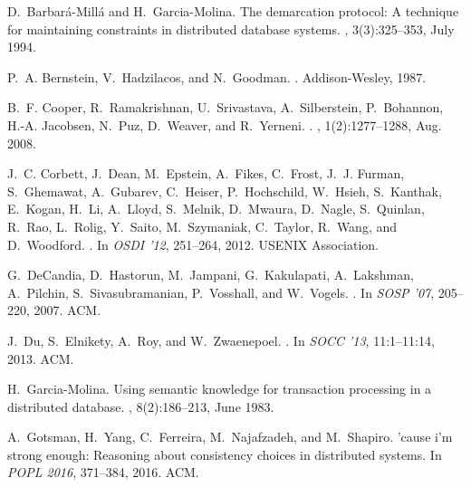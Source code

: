 \documentclass[11pt,dvipdfm]{article}
\begin{document}
\begin{thebibliography}{10}
\begin{small}
D.~Barbar\'{a}-Mill\'{a} and H.~Garcia-Molina.
\newblock The demarcation protocol: A technique for maintaining constraints in
  distributed database systems.
, 3(3):325--353, July 1994.

P.~A. Bernstein, V.~Hadzilacos, and N.~Goodman.
.
\newblock Addison-Wesley, 1987.

B.~F. Cooper, R.~Ramakrishnan, U.~Srivastava, A.~Silberstein, P.~Bohannon,
  H.-A. Jacobsen, N.~Puz, D.~Weaver, and R.~Yerneni.
.
, 1(2):1277--1288, Aug. 2008.

J.~C. Corbett, J.~Dean, M.~Epstein, A.~Fikes, C.~Frost, J.~J. Furman,
  S.~Ghemawat, A.~Gubarev, C.~Heiser, P.~Hochschild, W.~Hsieh, S.~Kanthak,
  E.~Kogan, H.~Li, A.~Lloyd, S.~Melnik, D.~Mwaura, D.~Nagle, S.~Quinlan,
  R.~Rao, L.~Rolig, Y.~Saito, M.~Szymaniak, C.~Taylor, R.~Wang, and
  D.~Woodford.
.
\newblock In {\em OSDI '12}, 251--264, 2012. USENIX
  Association.

G.~DeCandia, D.~Hastorun, M.~Jampani, G.~Kakulapati, A.~Lakshman, A.~Pilchin,
  S.~Sivasubramanian, P.~Vosshall, and W.~Vogels.
.
\newblock In {\em  SOSP '07}, 205--220, 2007. ACM.

J.~Du, S.~Elnikety, A.~Roy, and W.~Zwaenepoel.
.
\newblock In {\em  SOCC '13}, 11:1--11:14, 2013. ACM.

H.~Garcia-Molina.
\newblock Using semantic knowledge for transaction processing in a distributed
  database.
, 8(2):186--213, June 1983.

A.~Gotsman, H.~Yang, C.~Ferreira, M.~Najafzadeh, and M.~Shapiro.
\newblock 'cause i'm strong enough: Reasoning about consistency choices in
  distributed systems.
\newblock In {\em POPL 2016}, 371--384, 2016. ACM.


\end{small}
\end{thebibliography}
\end{document}
